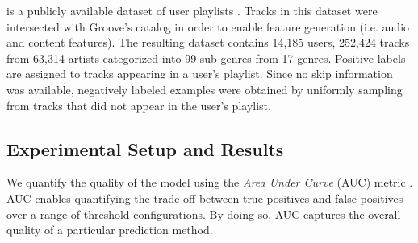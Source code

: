 is a publicly available dataset of user playlists \cite{DBLP:conf/recsys/TurrinQCPC15}. Tracks in this dataset were intersected with Groove's catalog in order to enable feature generation (i.e. audio and content features). The resulting dataset contains 14,185 users, 252,424 tracks from 63,314 artists categorized into 99 sub-genres from 17 genres. Positive labels are assigned to tracks appearing in a user's playlist. Since no skip information was available, negatively labeled examples were obtained by uniformly sampling from tracks that did not appear in the user's playlist.


\subsection{Experimental Setup and Results}
We quantify the quality of the model using the \textit{Area Under Curve} (AUC) metric \cite{AUCRef}. AUC enables quantifying the trade-off between true positives and false positives over a range of threshold configurations. By doing so, AUC captures the overall quality of a particular prediction method.



